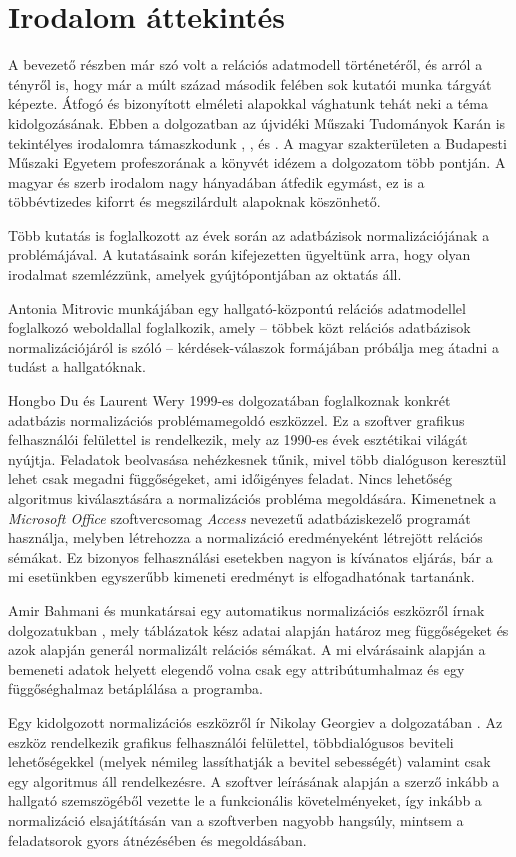 \chapter{Irodalom áttekintés}

A bevezető részben már szó volt a relációs adatmodell történetéről, és arról a tényről is, hogy már a múlt század második felében sok kutatói munka tárgyát képezte. Átfogó és bizonyított elméleti alapokkal vághatunk tehát neki a téma kidolgozásának. Ebben a dolgozatban az újvidéki Műszaki Tudományok Karán is tekintélyes irodalomra támaszkodunk \parencite{mogin1996}, \parencite{mogin2004}, \parencite{celikovic2021} és \parencite{kordic2018}. A magyar szakterületen a Budapesti Műszaki Egyetem profeszorának a könyvét \parencite{gajdos2019} idézem a dolgozatom több pontján. A magyar és szerb irodalom nagy hányadában átfedik egymást, ez is a többévtizedes kiforrt és megszilárdult alapoknak köszönhető.

Több kutatás is foglalkozott az évek során az adatbázisok normalizációjának a problémájával. A kutatásaink során kifejezetten ügyeltünk arra, hogy olyan irodalmat szemlézzünk, amelyek gyújtópontjában az oktatás áll.

Antonia Mitrovic munkájában \parencite{mitrovic2002} egy hallgató-központú relációs adatmodellel foglalkozó weboldallal foglalkozik, amely -- többek közt relációs adatbázisok normalizációjáról is szóló -- kérdések-válaszok formájában próbálja meg átadni a tudást a hallgatóknak.

Hongbo Du és Laurent Wery 1999-es dolgozatában \parencite{hongbo1999} foglalkoznak konkrét adatbázis normalizációs problémamegoldó eszközzel. Ez a szoftver grafikus felhasználói felülettel is rendelkezik, mely az 1990-es évek esztétikai világát nyújtja. Feladatok beolvasása nehézkesnek tűnik, mivel több dialóguson keresztül lehet csak megadni függőségeket, ami időigényes feladat. Nincs lehetőség algoritmus kiválasztására a normalizációs probléma megoldására. Kimenetnek a \textit{Microsoft Office} szoftvercsomag \textit{Access} nevezetű adatbáziskezelő programát használja, melyben létrehozza a normalizáció eredményeként létrejött relációs sémákat. Ez bizonyos felhasználási esetekben nagyon is kívánatos eljárás, bár a mi esetünkben egyszerűbb kimeneti eredményt is elfogadhatónak tartanánk.

Amir Bahmani és munkatársai egy automatikus normalizációs eszközről írnak dolgozatukban \parencite{bahmani2008}, mely táblázatok kész adatai alapján határoz meg függőségeket és azok alapján generál normalizált relációs sémákat. A mi elvárásaink alapján a bemeneti adatok helyett elegendő volna csak egy attribútumhalmaz és egy függőséghalmaz betáplálása a programba.

Egy kidolgozott normalizációs eszközről ír Nikolay Georgiev a dolgozatában \parencite{georgiev2008}. Az eszköz rendelkezik grafikus felhasználói felülettel, többdialógusos beviteli lehetőségekkel (melyek némileg lassíthatják a bevitel sebességét) valamint csak egy algoritmus áll rendelkezésre. A szoftver leírásának alapján a szerző inkább a hallgató szemszögéből vezette le a funkcionális követelményeket, így inkább a normalizáció elsajátításán van a szoftverben nagyobb hangsúly, mintsem a feladatsorok gyors átnézésében és megoldásában.
